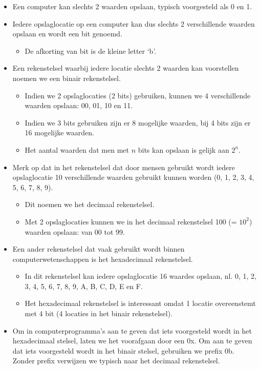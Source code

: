 \documentclass[]{memoir}
\providecommand{\tightlist}{%
  \setlength{\itemsep}{0pt}\setlength{\parskip}{0pt}}
\begin{document}
\begin{itemize}
\tightlist
\item
  Een computer kan slechts 2 waarden opslaan, typisch voorgesteld als 0 en 1.
\item
  Iedere opslaglocatie op een computer kan dus slechts 2 verschillende waarden opslaan en wordt een bit genoemd.

  \begin{itemize}
  \tightlist
  \item
    De afkorting van bit is de kleine letter `b'.
  \end{itemize}
\item
  Een rekenstelsel waarbij iedere locatie slechts 2 waarden kan voorstellen noemen we een binair rekenstelsel.

  \begin{itemize}
  \tightlist
  \item
    Indien we 2 opslaglocaties (2 bits) gebruiken, kunnen we 4 verschillende waarden opslaan: 00, 01, 10 en 11.
  \item
    Indien we 3 bits gebruiken zijn er 8 mogelijke waarden, bij 4 bits zijn er 16 mogelijke waarden.
  \item
    Het aantal waarden dat men met \(n\) bits kan opslaan is gelijk aan \(2^n\).
  \end{itemize}
\item
  Merk op dat in het rekenstelsel dat door mensen gebruikt wordt iedere opslaglocatie 10 verschillende waarden gebruikt kunnen worden (0, 1, 2, 3, 4, 5, 6, 7, 8, 9).

  \begin{itemize}
  \tightlist
  \item
    Dit noemen we het decimaal rekenstelsel.
  \item
    Met 2 opslaglocaties kunnen we in het decimaal rekenstelsel 100 (= \(10^2\)) waarden opslaan: van 00 tot 99.
  \end{itemize}
\item
  Een ander rekenstelsel dat vaak gebruikt wordt binnen computerwetenschappen is het hexadecimaal rekenstelsel.

  \begin{itemize}
  \tightlist
  \item
    In dit rekenstelsel kan iedere opslaglocatie 16 waardes opslaan, nl. 0, 1, 2, 3, 4, 5, 6, 7, 8, 9, A, B, C, D, E en F.
  \item
    Het hexadecimaal rekenstelsel is interessant omdat 1 locatie overeenstemt met 4 bit (4 locaties in het binair rekenstelsel).
  \end{itemize}
\item
  Om in computerprogramma's aan te geven dat iets voorgesteld wordt in het hexadecimaal stelsel, laten we het voorafgaan door een 0x. Om aan te geven dat iets voorgesteld wordt in het binair stelsel, gebruiken we prefix 0b. Zonder prefix verwijzen we typisch naar het decimaal rekenstelsel.
\end{itemize}
\end{document}
